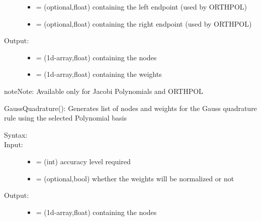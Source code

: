 \documentclass[letterpaper,10pt,english]{sphinxmanual}
\begin{document}
\begin{fulllineitems}
\begin{fulllineitems}
\begin{description}
\begin{itemize}
\item {} 
 = (optional,float) containing the left endpoint (used by ORTHPOL)

\item {} 
 = (optional,float) containing the right endpoint (used by ORTHPOL)

\end{itemize}

\item[{Output:}] \leavevmode\begin{itemize}
\item {} 
 = (1d-array,float) containing the nodes

\item {} 
 = (1d-array,float) containing the weights

\end{itemize}

\end{description}

\begin{notice}{note}{Note:}
Available only for Jacobi Polynomials and ORTHPOL
\end{notice}

\end{fulllineitems}


\begin{fulllineitems}
\label{index:SpectralToolbox.Spectral1D.Poly1D.GaussQuadrature}
GaussQuadrature(): Generates list of nodes and weights for the Gauss quadrature rule using the selected Polynomial basis
\begin{description}
\item[{Syntax:}] \leavevmode
{}

\item[{Input:}] \leavevmode\begin{itemize}
\item {} 
 = (int) accuracy level required

\item {} 
 = (optional,bool) whether the weights will be normalized or not

\end{itemize}

\item[{Output:}] \leavevmode\begin{itemize}
\item {} 
 = (1d-array,float) containing the nodes


\end{itemize}
\end{description}
\end{fulllineitems}
\end{fulllineitems}
\end{document}
